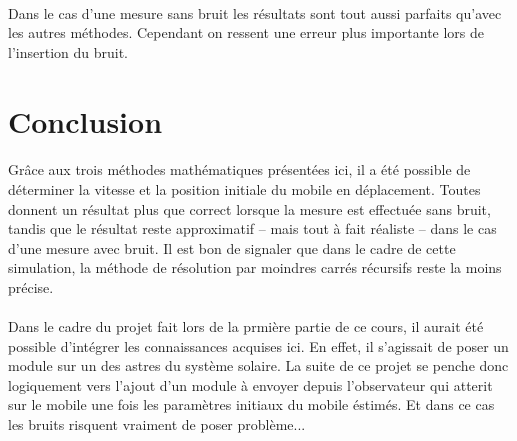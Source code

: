 \documentclass[a4paper,11pt]{article}
\begin{document}
			\paragraph{}
			Dans le cas d'une mesure sans bruit les résultats sont tout aussi parfaits qu'avec les autres méthodes. Cependant on ressent une erreur plus importante lors de l'insertion du bruit.

	\newpage

	\section{Conclusion}
		
		\paragraph{}
		Grâce aux trois méthodes mathématiques présentées ici, il a été possible de déterminer la vitesse et la position initiale du mobile en déplacement. Toutes donnent un résultat plus que correct lorsque la mesure est effectuée sans bruit, tandis que le résultat reste approximatif – mais tout à fait réaliste – dans le cas d’une mesure avec bruit. Il est bon de signaler que dans le cadre de cette simulation, la méthode de résolution par moindres carrés récursifs reste la moins précise.

		\paragraph{}
		Dans le cadre du projet fait lors de la prmière partie de ce cours, il aurait été possible d’intégrer les connaissances acquises ici. En effet, il s’agissait de poser un module sur un des astres du système solaire. La suite de ce projet se penche donc logiquement vers l'ajout d'un module à envoyer depuis l'observateur qui atterit sur le mobile une fois les paramètres initiaux du mobile éstimés. Et dans ce cas les bruits risquent vraiment de poser problème...
\end{document}
